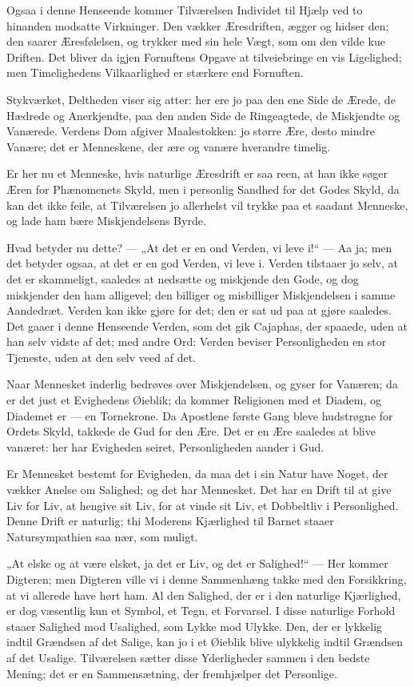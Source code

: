 \documentclass[12pt,a4paper]{book}
\newcommand{\apage}[1]{\marginnote{\footnotesize\textit{[#1]}}}
\begin{document}
Ogsaa i denne Henseende kommer Tilværelsen Individet til Hjælp ved to
hinanden modsatte Virkninger. Den vækker Æresdriften, ægger og hidser
den; den saarer Æresfølelsen, og trykker med sin hele Vægt, som om den
vilde kue Driften. Det bliver da igjen Fornuftens Opgave at
tilveiebringe en vis Ligelighed; men Timelighedens Vilkaarlighed er
stærkere end Fornuften.

Stykværket, Deltheden viser sig atter: her ere jo paa den ene Side de
Ærede, de Hædrede og Anerkjendte, paa den \apage{40} anden
Side de Ringeagtede, de Miskjendte og Vanærede. Verdens Dom afgiver
Maalestokken: jo større Ære, desto mindre Vanære; det er Menneskene,
der ære og vanære hverandre timelig.

Er her nu et Menneske, hvis naturlige Æresdrift er saa reen, at han
ikke søger Æren for Phænomenets Skyld, men i personlig Sandhed for det
Godes Skyld, da kan det ikke feile, at Tilværelsen jo allerhelst vil
trykke paa et saadant Menneske, og lade ham bære Miskjendelsens Byrde.

Hvad betyder nu dette? — „At det er en ond Verden, vi leve i!“ — Aa ja;
men det betyder ogsaa, at det er en god Verden, vi leve i. Verden
tilstaaer jo selv, at det er skammeligt, saaledes at nedsætte og
miskjende den Gode, og dog miskjender den ham alligevel; den billiger og
misbilliger Miskjendelsen i samme Aandedræt. Verden kan ikke gjøre for
det; den er sat ud paa at gjøre saaledes. Det gaaer i denne Henseende
Verden, som det gik Cajaphas, der spaaede, uden at han selv vidste af
det; med andre Ord: Verden beviser Personligheden en stor Tjeneste, uden
at den selv veed af det.

Naar Mennesket inderlig bedrøves over Miskjendelsen, og gyser for
Vanæren; da er det just et Evighedens Øieblik; da kommer Religionen med
et Diadem, og Diademet er — en Tornekrone. Da Apostlene første Gang
bleve hudstrøgne for Ordets Skyld, takkede de Gud for den Ære. Det er
en Ære saaledes at blive vanæret: her har Evigheden seiret, Personligheden
aander i Gud.

Er Mennesket bestemt for Evigheden, da maa det i sin Natur have Noget,
der vækker Anelse om Salighed; og det har Mennesket. Det har en Drift
til at give Liv for Liv, at hengive sit Liv, for at vinde sit Liv, et
Dobbeltliv i Personlighed. Denne Drift er naturlig; thi Moderens
Kjærlighed til Barnet staaer Natursympathien saa nær, som muligt.

„At elske og at være elsket, ja det er Liv, og det er Salighed!“ — Her
kommer Digteren; men Digteren ville vi i denne \apage{41}
Sammenhæng takke med den Forsikkring, at vi allerede have hørt ham. Al
den Salighed, der er i den naturlige Kjærlighed, er dog væsentlig kun et
Symbol, et Tegn, et Forvarsel. I disse naturlige Forhold staaer Salighed
mod Usalighed, som Lykke mod Ulykke. Den, der er lykkelig indtil
Grændsen af det Salige, kan jo i et Øieblik blive ulykkelig indtil
Grændsen af det Usalige. Tilværelsen sætter disse Yderligheder sammen i
den bedste Mening; det er en Sammensætning, der fremhjælper det
Personlige.
\end{document}
